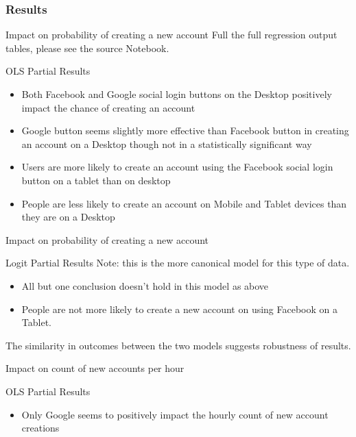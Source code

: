 \documentclass{beamer}
\begin{document}
			\subsubsection{Results}
			\begin{frame}{Impact on probability of creating a new account}
				Full the full regression output tables, please see the source Notebook.
				\begin{block}{OLS Partial Results}
					\begin{itemize}
						\item Both Facebook and Google social login buttons on the Desktop positively impact the chance of creating an account
						\item Google button seems slightly more effective than Facebook button in creating an account on a Desktop though not in a statistically significant way
						\item Users are more likely to create an account using the Facebook social login button on a tablet than on desktop
						\item People are less likely to create an account on Mobile and Tablet devices than they are on a Desktop
					\end{itemize}
				\end{block}
			\end{frame}
			\begin{frame}{Impact on probability of creating a new account}		
				\begin{block}{Logit Partial Results}
					Note: this is the more canonical model for this type of data. 
					\begin{itemize}
						\item All but one conclusion doesn't hold in this model as above
						\item People are not more likely to create a new account on using Facebook on a Tablet.
					\end{itemize}
				\end{block}
				The similarity in outcomes between the two models suggests robustness of results.
			\end{frame}
			
			\begin{frame}{Impact on count of new accounts per hour}
				\begin{block}{OLS Partial Results}
					\begin{itemize}
						\item Only Google seems to positively impact the hourly count of new account creations
					\end{itemize}
				\end{block}
			\end{frame}
			
\end{document}
